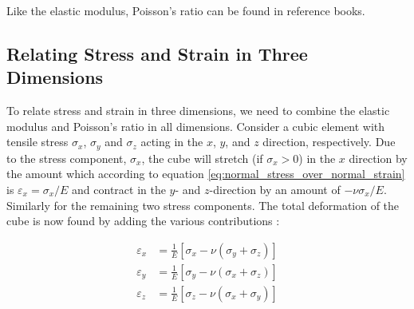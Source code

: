 Like the elastic modulus, Poisson's ratio can be found in reference
books.

\subsection{Relating Stress and Strain in Three Dimensions}
\label{sec:stress-strain-relation-in-3d}
To relate stress and strain in three dimensions, we need to combine
the elastic modulus and Poisson's ratio in all dimensions.
%
%
Consider a cubic element with tensile stress $\sigma_x$, $\sigma_y$
and $\sigma_z$ acting in the $x$, $y$, and $z$ direction, respectively.
%
%
%
%
Due to the stress component, $\sigma_x$, the cube will stretch (if
$\sigma_x > 0$) in the $x$ direction by the amount which according to
equation \eqref{eq:normal_stress_over_normal_strain} is $\varepsilon_x
= \sigma_x / E$ and contract in the $y$- and $z$-direction by an amount of
$-\nu \sigma_x /E$. Similarly for the remaining two stress
components. The total deformation of the cube is now found by adding
the various contributions :

\begin{equation}
\label{eq:hookes-law-in-3d}
\begin{aligned}
    \varepsilon_x &= \frac {1}{E} \left [ \sigma_x - \nu \left (
        \sigma_y + \sigma_z \right ) \right ] \\
    \varepsilon_y &= \frac {1}{E} \left [ \sigma_y - \nu \left (
        \sigma_x + \sigma_z \right ) \right ] \\
    \varepsilon_z &= \frac {1}{E} \left [ \sigma_z - \nu \left (
        \sigma_x + \sigma_y \right ) \right ]  
\end{aligned}
\end{equation}

